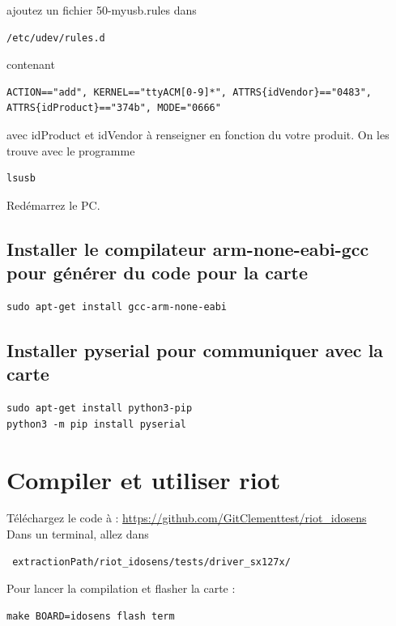 \documentclass{article}
\begin{document}
ajoutez un fichier 50-myusb.rules dans 

\begin{verbatim}
/etc/udev/rules.d

\end{verbatim}
contenant 

\begin{verbatim}
ACTION=="add", KERNEL=="ttyACM[0-9]*", ATTRS{idVendor}=="0483",
ATTRS{idProduct}=="374b", MODE="0666"

\end{verbatim}

avec idProduct et idVendor à renseigner en fonction du votre produit. On les trouve avec le programme

\begin{verbatim}
lsusb

\end{verbatim}
Redémarrez le PC.
\subsection{Installer le compilateur arm-none-eabi-gcc pour générer du code pour la carte}

\begin{verbatim}
sudo apt-get install gcc-arm-none-eabi

\end{verbatim}


\subsection{Installer pyserial pour communiquer avec la carte}

\begin{verbatim}
sudo apt-get install python3-pip
python3 -m pip install pyserial
\end{verbatim}

\section{Compiler et utiliser riot}


Téléchargez le code à : \url{https://github.com/GitClementtest/riot_idosens}\\
Dans un terminal, allez dans 

\begin{verbatim}
 extractionPath/riot_idosens/tests/driver_sx127x/
\end{verbatim}



Pour lancer la compilation et flasher la carte :
\begin{verbatim}
make BOARD=idosens flash term
\end{verbatim}
\end{document}
